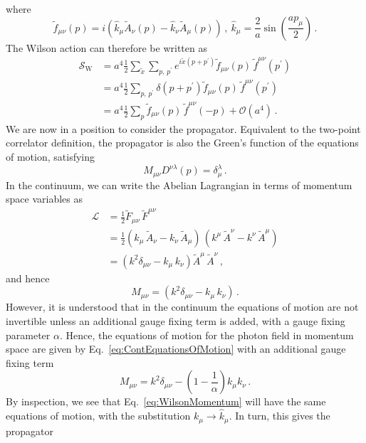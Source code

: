 %
where
%
\begin{equation}
\tilde{f}_{\mu\nu}(p) = i\left(\hat{k}_\mu \tilde{A}_\nu(p) - \hat{k}_\nu \tilde{A}_\mu(p)\right)\, ,~\hat{k}_\mu = \frac{2}{a}\sin\left(\frac{ap_\mu}{2}\right)\, .
\end{equation}
%
The Wilson action can therefore be written as
%
\begin{align}
\mathcal{S}_\text{W} &= a^4\frac{1}{2}\sum_{\tilde{x}}\sum_{p,\,p^\prime}e^{i\tilde{x}(p+p^\prime)}\tilde{f}_{\mu\nu}(p) \, \tilde{f}^{\mu\nu}(p^\prime)\nonumber\\
&=a^4\frac{1}{2}\sum_{p,\,p^\prime} \delta(p+p^\prime)\tilde{f}_{\mu\nu}(p) \, \tilde{f}^{\mu\nu}(p^\prime) \nonumber\\
&= a^4\frac{1}{2}\sum_{p}\tilde{f}_{\mu\nu}(p) \, \tilde{f}^{\mu\nu}(-p) + \mathcal{O}(a^4)\, . \label{eq:WilsonMomentum}
\end{align}
%
We are now in a position to consider the propagator. Equivalent to the two-point correlator definition, the propagator is also the Green's function of the equations of motion, satisfying
%
\begin{equation}
M_{\mu\nu}D^{\nu\lambda}(p) = \delta_\mu^\lambda\, .
\end{equation}
%
In the continuum, we can write the Abelian Lagrangian in terms of momentum space variables as 
%
\begin{align*}
\mathcal{L} &= \frac{1}{2}\tilde{F}_{\mu\nu}\,\tilde{F}^{\mu\nu}\\
&= \frac{1}{2}(k_\mu\,\tilde{A}_\nu - k_\nu\,\tilde{A}_\mu)\,(k^\mu\,\tilde{A}^\nu - k^\nu\,\tilde{A}^\mu)\\
&= (k^2\delta_{\mu\nu} - k_\mu\,k_\nu)\tilde{A}^\mu\,\tilde{A}^\nu\, ,
\end{align*}
%
and hence
%
\begin{equation}
M_{\mu\nu} = (k^2\delta_{\mu\nu} - k_\mu\,k_\nu)\, .
\label{eq:ContEquationsOfMotion}
\end{equation}
%
However, it is understood that in the continuum the equations of motion are not invertible unless an additional gauge fixing term is added, with a gauge fixing parameter $\alpha$. Hence, the equations of motion for the photon field in momentum space are given by Eq.~\ref{eq:ContEquationsOfMotion} with an additional gauge fixing term~\cite{ryder1996quantum}
%
\begin{equation}
M_{\mu\nu} = k^2\delta_{\mu\nu} - \left(1-\frac{1}{\alpha}\right)k_\mu k_\nu\, .
\end{equation}
%
By inspection, we see that Eq.~\ref{eq:WilsonMomentum} will have the same equations of motion, with the substitution $k_\mu\rightarrow \hat{k}_\mu$. In turn, this gives the propagator
